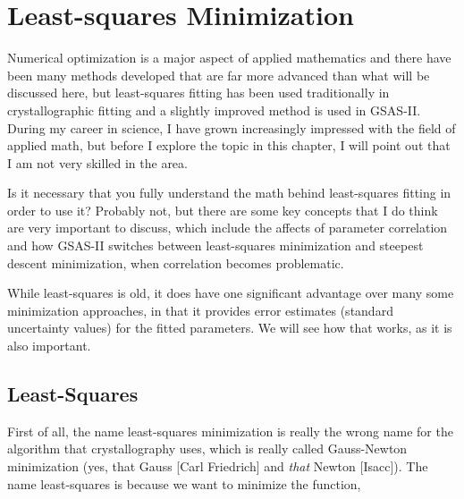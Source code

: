 \chapter{Least-squares Minimization}\label{Chap:Leastsquares}

Numerical optimization is a major aspect of applied mathematics and there have been many methods developed that are far more advanced than what will be discussed here, but least-squares fitting has been used traditionally in crystallographic fitting and a slightly improved method is used in GSAS-II. During my career in science, I have grown increasingly impressed with the field of applied math, but before I explore the topic in this chapter, I will point out that I am not very skilled in the area. 

Is it necessary that you fully understand the math behind least-squares fitting in order to use it? Probably not, but there are some key concepts that I do think are very important to discuss, which include the affects of parameter correlation and how GSAS-II switches between least-squares minimization and steepest descent minimization, when correlation becomes problematic. 

While least-squares is old, it does have one significant advantage over many some minimization approaches, in that it provides error estimates (standard uncertainty values) for the fitted parameters. We will see how that works, as it is also important. 

\section{Least-Squares}

First of all, the name least-squares minimization is really the wrong name for the algorithm that crystallography uses, which is really called Gauss-Newton minimization (yes, that Gauss [Carl Friedrich] and \textit{that} Newton [Isacc]). The name least-squares is because we want to minimize the function, 

